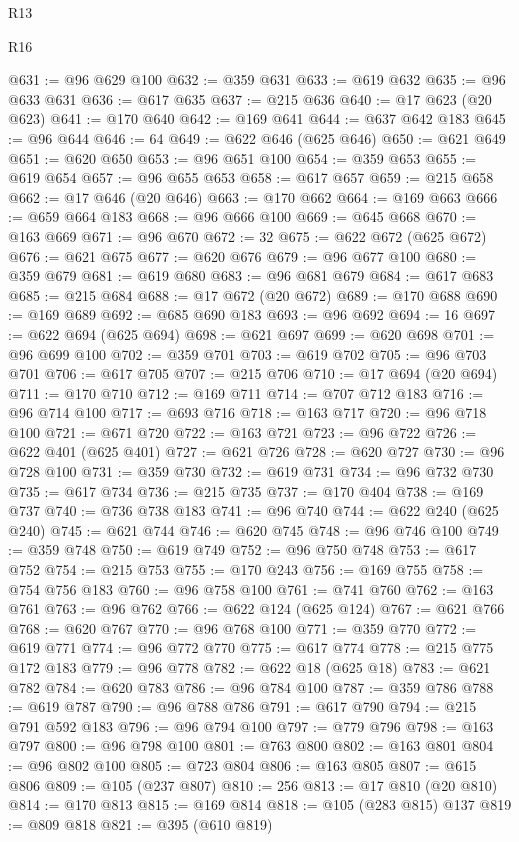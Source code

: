 \begin{lexlean}{R13}
\begin{lexlean}{R16}
\begin{coremodule}
{{{{{{{{{{{{{{{{{{{{{{{{{{{{{{{{{{{{{{{{{{{{{{{{{{{{{{{{{{{{{{{{{{{{{{{{{{{{{{{{{{{{{{{{{{{{{{{{{{{{{{{{{{{{{{{{{@631 := @96 @629 @100
@632 := @359 @631
@633 := @619 @632
@635 := @96 @633 @631
@636 := @617 @635
@637 := @215 @636
@640 := @17 @623 (@20 @623)
@641 := @170 @640
@642 := @169 @641
@644 := @637 @642 @183
@645 := @96 @644
@646 := 64
@649 := @622 @646 (@625 @646)
@650 := @621 @649
@651 := @620 @650
@653 := @96 @651 @100
@654 := @359 @653
@655 := @619 @654
@657 := @96 @655 @653
@658 := @617 @657
@659 := @215 @658
@662 := @17 @646 (@20 @646)
@663 := @170 @662
@664 := @169 @663
@666 := @659 @664 @183
@668 := @96 @666 @100
@669 := @645 @668
@670 := @163 @669
@671 := @96 @670
@672 := 32
@675 := @622 @672 (@625 @672)
@676 := @621 @675
@677 := @620 @676
@679 := @96 @677 @100
@680 := @359 @679
@681 := @619 @680
@683 := @96 @681 @679
@684 := @617 @683
@685 := @215 @684
@688 := @17 @672 (@20 @672)
@689 := @170 @688
@690 := @169 @689
@692 := @685 @690 @183
@693 := @96 @692
@694 := 16
@697 := @622 @694 (@625 @694)
@698 := @621 @697
@699 := @620 @698
@701 := @96 @699 @100
@702 := @359 @701
@703 := @619 @702
@705 := @96 @703 @701
@706 := @617 @705
@707 := @215 @706
@710 := @17 @694 (@20 @694)
@711 := @170 @710
@712 := @169 @711
@714 := @707 @712 @183
@716 := @96 @714 @100
@717 := @693 @716
@718 := @163 @717
@720 := @96 @718 @100
@721 := @671 @720
@722 := @163 @721
@723 := @96 @722
@726 := @622 @401 (@625 @401)
@727 := @621 @726
@728 := @620 @727
@730 := @96 @728 @100
@731 := @359 @730
@732 := @619 @731
@734 := @96 @732 @730
@735 := @617 @734
@736 := @215 @735
@737 := @170 @404
@738 := @169 @737
@740 := @736 @738 @183
@741 := @96 @740
@744 := @622 @240 (@625 @240)
@745 := @621 @744
@746 := @620 @745
@748 := @96 @746 @100
@749 := @359 @748
@750 := @619 @749
@752 := @96 @750 @748
@753 := @617 @752
@754 := @215 @753
@755 := @170 @243
@756 := @169 @755
@758 := @754 @756 @183
@760 := @96 @758 @100
@761 := @741 @760
@762 := @163 @761
@763 := @96 @762
@766 := @622 @124 (@625 @124)
@767 := @621 @766
@768 := @620 @767
@770 := @96 @768 @100
@771 := @359 @770
@772 := @619 @771
@774 := @96 @772 @770
@775 := @617 @774
@778 := @215 @775 @172 @183
@779 := @96 @778
@782 := @622 @18 (@625 @18)
@783 := @621 @782
@784 := @620 @783
@786 := @96 @784 @100
@787 := @359 @786
@788 := @619 @787
@790 := @96 @788 @786
@791 := @617 @790
@794 := @215 @791 @592 @183
@796 := @96 @794 @100
@797 := @779 @796
@798 := @163 @797
@800 := @96 @798 @100
@801 := @763 @800
@802 := @163 @801
@804 := @96 @802 @100
@805 := @723 @804
@806 := @163 @805
@807 := @615 @806
@809 := @105 (@237 @807)
@810 := 256
@813 := @17 @810 (@20 @810)
@814 := @170 @813
@815 := @169 @814
@818 := @105 (@283 @815) @137
@819 := @809 @818
@821 := @395 (@610 @819)
}}}}}}}}}}}}}}}}}}}}}}}}}}}}}}}}}}}}}}}}}}}}}}}}}}}}}}}}}}}}}}}}}}}}}}}}}}}}}}}}}}}}}}}}}}}}}}}}}}}}}}}}}}}}}}}}}
\end{coremodule}
\end{lexlean}
\end{lexlean}
